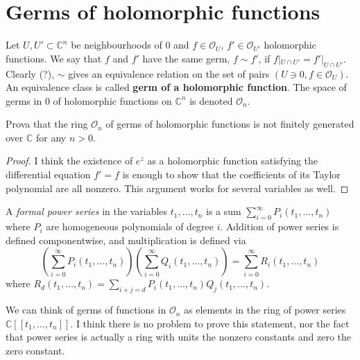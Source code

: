 \section{Germs of holomorphic functions}
\label{section-germs-of-holomorphic-functions}

\begin{definition}
\label{definition-germ-of-holomorphic-function}
Let $U,U' \subset \mathbb{C}^n$ be neighbourhoods of $0$ and $f \in
\mathcal{O}_U$, $f'\in\mathcal{O}_{U'}$ holomorphic functions. We say that $f$
and $f'$ have the same germ, $f\sim f'$, if $f|_{U\cap U'}=f'|_{U\cap U'}$.
Clearly (?), $\sim$ gives an equivalence relation on the set of pairs $(U\ni 0,
f\in \mathcal{O}_U)$. An equivalence class is called {\bf germ of a holomorphic
function}. The space of germs in $0$ of holomorphic functions on $\mathbb{C}^n$
is denoted $\mathcal{O}_n$.
\end{definition}

\begin{exercise}
\label{exercise-stalk-is-not-finitely-generated-over-C}
Prova that the ring $\mathcal{O}_n$ of germs of holomorphic functions is not
finitely generated over $\mathbb{C}$ for any $n>0$.
\end{exercise}

\begin{proof}
I think the existence of $e^z$ as a holomorphic function satisfying the
differential equation $f'=f$ is enough to show that the coefficients of its
Taylor polynomial are all nonzero. This argument works for several variables as
well.
\end{proof}

\begin{definition}
\label{definition-formal-power-series}
A {\it formal power series} in the variables $t_1,\ldots,t_n$ is a sum
$\sum_{i=0}^{\infty}P_i(t_1,\ldots,t_n)$ where $P_i$ are homogeneous polynomials
of degree $i$. Addition of power series is defined componentwise, and
multiplication is defined via
$$
\left(\sum_{i=0}^\infty P_i(t_1,\ldots,t_n)\right)
\left(\sum_{i=0}^\infty Q_i(t_1,\ldots,t_n)\right)
=\sum_{i=0}^\infty R_i(t_1,\ldots,t_n)
$$
where $R_d(t_1,\ldots,t_n)=\sum_{i+j=d}P_i(t_1,\ldots,t_n)Q_j(t_1,\ldots,t_n)$.
\end{definition}

We can think of germs of functions in $\mathcal{O}_n$ as elements in the ring of
power series $\mathbb{C}[\![t_1,\ldots,t_n]\!]$. I think there is no problem to
prove this statement, nor the fact that power series is actually a ring with
units the nonzero constants and zero the zero constant.

